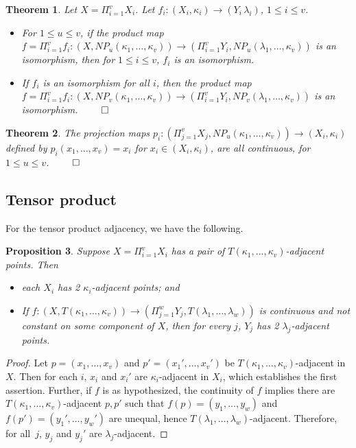 \documentclass{article}
\theoremstyle{plain}
\newtheorem{thm}{Theorem}
\newtheorem{prop}[thm]{Proposition}
\theoremstyle{definition}
\numberwithin{thm}{section}
\begin{document}
\begin{thm}
\label{prod-iso}
\rm{\cite{Boxer16a}}
Let $X = \Pi_{i=1}^v X_i$.
Let $f_i: (X_i,\kappa_i) \to (Y_i\,\lambda_i)$, $1 \leq i \leq v$.
\begin{itemize}
\item For $1 \leq u \leq v$, if
the product map
$f=\Pi_{i=1}^v f_i: (X, NP_u(\kappa_1,\ldots,\kappa_v)) \to 
(\Pi_{i=1}^v Y_i, NP_u(\lambda_1,\ldots,\kappa_v))$ is an isomorphism, then
for $1 \leq i \leq v$, $f_i$ is an
isomorphism.
\item If $f_i$ is an isomorphism for all $i$, then the product map
$f=\Pi_{i=1}^v f_i: (X, NP_v(\kappa_1,\ldots,\kappa_v)) \to 
(\Pi_{i=1}^v Y_i, NP_v(\lambda_1,\ldots,\kappa_v))$ is an isomorphism. $\qed$
\end{itemize}
\end{thm}

\begin{thm}
\label{projection-cont}
{\rm \cite{Han05,Boxer16a}}
The projection maps
$p_i: (\Pi_{j=1}^v X_j, NP_u(\kappa_1, \ldots, \kappa_v)) \to (X_i, \kappa_i)$
defined by $p_i(x_1, \ldots, x_v) = x_i$
for $x_i \in (X_i,\kappa_i)$, are all continuous, for $1 \leq u \leq v$. $\qed$
\end{thm}

\subsection{Tensor product}
For the tensor product adjacency, we have the following.

\begin{prop}
\label{no-1zs}
Suppose $X=\Pi_{i=1}^v X_i$ has a pair of $T(\kappa_1,\ldots,\kappa_v)$-adjacent points. Then
\begin{itemize}
\item each $X_i$ has 2 $\kappa_i$-adjacent points;
      and
\item If $f: (X,T(\kappa_1,\ldots,\kappa_v)) \to 
      (\Pi_{j=1}^w Y_j, T(\lambda_1,\ldots,\lambda_w))$
      is continuous and not constant on some
      component of $X$, then for every $j$, $Y_j$
      has 2 $\lambda_j$-adjacent points.      
\end{itemize}
\end{prop}

\begin{proof} Let 
$p=(x_1,\ldots,x_v)$ and $p'=(x_1',\ldots,x_v')$
be $T(\kappa_1,\ldots,\kappa_v)$-adjacent in $X$.
Then for each $i$, $x_i$ and $x_i'$ are
$\kappa_i$-adjacent in $X_i$, which establishes
the first assertion. Further, if $f$ is
as hypothesized, the continuity of $f$ implies
there are $T(\kappa_1,\ldots,\kappa_v)$-adjacent
$p,p'$ such that
$f(p)=(y_1,\ldots, y_w)$ and $f(p')=(y_1',\ldots, y_w')$ are unequal, hence $T(\lambda_1,\ldots,\lambda_w)$-adjacent. Therefore, for all~$j$,
$y_j$ and $y_j'$ are $\lambda_j$-adjacent.
\end{proof}
\end{document}
